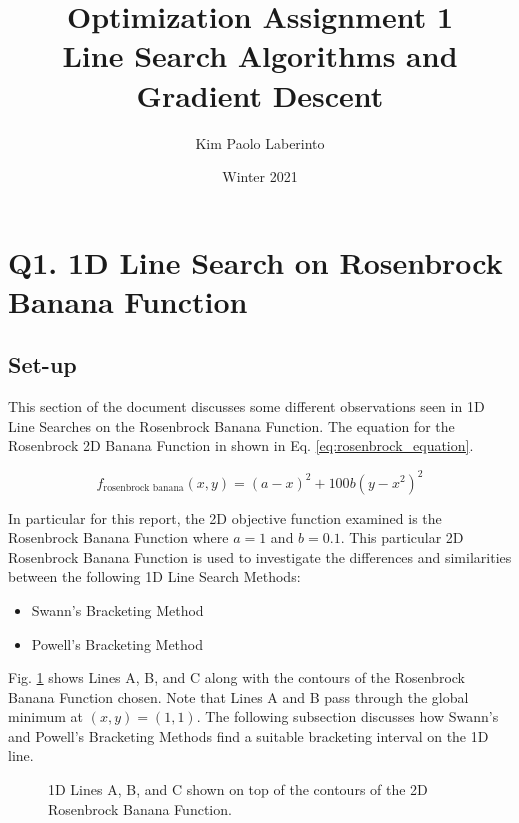 \documentclass{article}
\title{Optimization Assignment 1\\Line Search Algorithms and Gradient Descent}
\date{Winter 2021}
\author{Kim Paolo Laberinto}
\begin{document}
    \maketitle
    \newpage

    \tableofcontents
    \newpage

    \section{Q1. 1D Line Search on Rosenbrock Banana Function}

    \subsection{Set-up}

    This section of the document discusses some different observations seen in 1D Line Searches on the Rosenbrock Banana Function.
    The equation for the Rosenbrock 2D Banana Function in shown in Eq. \ref{eq:rosenbrock_equation}. 
    
    \begin{equation} \label{eq:rosenbrock_equation}
        f_{\text{rosenbrock banana}}(x, y) = (a - x)^2 + 100b(y-x^2)^2
    \end{equation}
    
    In particular for this report, the 2D objective function examined is the Rosenbrock Banana Function where $a = 1$ and $b = 0.1$. 
    This particular 2D Rosenbrock Banana Function is used to investigate the differences and similarities between the following 1D Line Search Methods:
    \begin{itemize}
        \item Swann's Bracketing Method
        \item Powell's Bracketing Method
    \end{itemize}

    Fig. \ref{fig:AllLinesPlot} shows Lines A, B, and C along with the contours of the Rosenbrock Banana Function chosen. 
    Note that Lines A and B pass through the global minimum at $(x, y) = (1, 1)$. 
    The following subsection discusses how Swann's and Powell's Bracketing Methods find a suitable bracketing interval on the 1D line.

    \begin{figure}[H]
        \centering
        
        \caption{1D Lines A, B, and C shown on top of the contours of the 2D Rosenbrock Banana Function.}
        \label{fig:AllLinesPlot}
    \end{figure}
\end{document}
